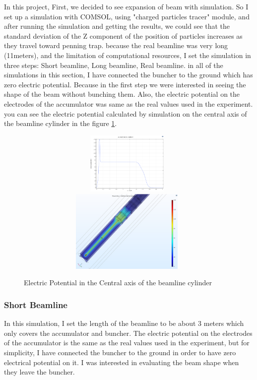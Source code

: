\documentclass[12pt,a4paper]{article}
\begin{document}
In this project, First, we decided to see expansion of beam with simulation. So I set up a simulation with COMSOL, using "charged particles tracer" module, and after running the simulation and getting the results, we could see that the standard deviation of the Z component of the position of particles increases as they travel toward penning trap. because the real beamline was very long (11meters), and the limitation of computational resources, I set the simulation in three steps: Short beamline, Long beamline, Real beamline. in all of the simulations in this section, I have connected the buncher to the ground which has zero electric potential. Because in the first step we were interested in seeing the shape of the beam without bunching them. Also, the electric potential on the electrodes of the accumulator was  same as the real values used in the experiment. you can see the electric potential calculated by simulation on the central axis of the beamline cylinder in the figure \ref{potential}.

\begin{figure}[h]

\centering
\includegraphics[width=110mm, height=30mm]{potential}
\includegraphics[width=110mm, height=40mm]{potential-3D}
\caption{Electric Potential in the Central axis of the beamline cylinder}
\label{potential}
\end{figure}

\subsubsection{Short Beamline}
In this simulation, I set the length of the beamline to be about 3 meters which only covers the accumulator and buncher. The electric potential on the electrodes of the accumulator is the same as the real values used in the experiment, but for simplicity, I have connected the buncher to the ground in order to have zero electrical potential on it. I was interested in evaluating the beam shape when they leave the buncher.
\end{document}
